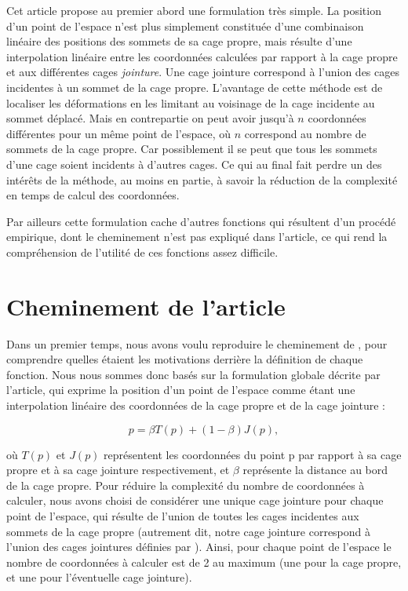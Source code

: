 Cet article propose au premier abord une formulation très simple. La
position d'un point de l'espace n'est plus simplement constituée d'une
combinaison linéaire des positions des sommets de sa cage propre, mais
résulte d'une interpolation linéaire entre les coordonnées calculées
par rapport à la cage propre et aux différentes cages
\textit{jointure}. Une cage jointure correspond à l'union des cages
incidentes à un sommet de la cage propre. L'avantage de cette méthode
est de localiser les déformations en les limitant au voisinage de la
cage incidente au sommet déplacé. Mais en contrepartie on peut avoir
jusqu'à $n$ coordonnées différentes pour un même point de l'espace, où
$n$ correspond au nombre de sommets de la cage propre. Car
possiblement il se peut que tous les sommets d'une cage soient
incidents à d'autres cages. Ce qui au final fait perdre un des
intérêts de la méthode, au moins en partie, à savoir la réduction de
la complexité en temps de calcul des coordonnées.

Par ailleurs cette formulation cache d'autres fonctions qui résultent
d'un procédé empirique, dont le cheminement n'est pas expliqué dans
l'article, ce qui rend la compréhension de l'utilité de ces fonctions
assez difficile.

\section{Cheminement de l'article}
Dans un premier temps, nous avons voulu reproduire le cheminement de
\cite{GPCP13}, pour comprendre quelles étaient les motivations
derrière la définition de chaque fonction. Nous nous sommes donc basés
sur la formulation globale décrite par l'article, qui exprime la
position d'un point de l'espace comme étant une interpolation linéaire
des coordonnées de la cage propre et de la cage jointure :

\begin{equation}
  p = \beta T(p)  + (1 - \beta) J(p),
  \label{MELgen}
\end{equation}

où $T(p)$ et $J(p)$ représentent les coordonnées du point p par
rapport à sa cage propre et à sa cage jointure respectivement, et
$\beta$ représente la distance au bord de la cage propre. Pour réduire
la complexité du nombre de coordonnées à calculer, nous avons choisi
de considérer une unique cage jointure pour chaque point de l'espace,
qui résulte de l'union de toutes les cages incidentes aux sommets de
la cage propre (autrement dit, notre cage jointure correspond à
l'union des cages jointures définies par \cite{GPCP13}). Ainsi, pour
chaque point de l'espace le nombre de coordonnées à calculer est de 2
au maximum (une pour la cage propre, et une pour l'éventuelle cage
jointure).

